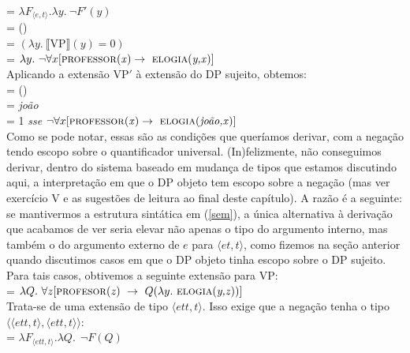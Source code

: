 \n {} = $\lambda F_{\langle e,t\rangle}.\lambda
y.\ \neg F'(y)$\\

\n {} = ()\\

\n {} = $(\lambda y.\ \llbracket\text{VP}\rrbracket(y)=0)$\\

\n {} = $\lambda y.\ \neg\forall x [\predica{professor}{x} \rightarrow\ \predica{elogia}{y,x}]$\\

\n Aplicando a extensão VP$'$ à extensão do DP sujeito, obtemos:\\ 

\n {} = ()\\

\n {} = \textit{joão}\\

\n {} = 1 \textit{sse} $\neg\forall x [\predica{professor}{x} \rightarrow\ \predica{elogia}{joão,x}]$\\

\n Como se pode notar, essas são as condições que queríamos
derivar, com a negação tendo escopo sobre o quantificador
universal. (In)felizmente, não conseguimos
derivar, dentro do sistema baseado em mudança de tipos que estamos
discutindo aqui, a interpretação em que o DP objeto tem escopo
sobre a negação (mas ver exercício V e as sugestões de leitura ao final deste capítulo). A razão é a seguinte: se mantivermos a estrutura sintática em (\ref{sem}), a única alternativa à derivação que acabamos de ver seria elevar não apenas o tipo do argumento interno, mas também o do argumento externo de $e$ para $\langle et,t\rangle$, como fizemos na seção anterior quando discutimos casos em que o DP objeto tinha escopo sobre o DP sujeito. Para tais casos, obtivemos a seguinte extensão para VP:\\

\n {} = $\lambda Q.\ \forall z [\predica{profesor}{z}\ \rightarrow\ Q(\lambda y.\ \predica{elogia}{y,z})]$\\

\n Trata-se de uma extensão de tipo $\langle ett,t\rangle$.  Isso exige que a negação tenha o tipo $\langle \langle ett,t\rangle,\langle ett,t\rangle\rangle$:\\

\n  {} = $\lambda F_{\langle ett,t\rangle}.\lambda Q.\
\ \neg F(Q)$  \\

